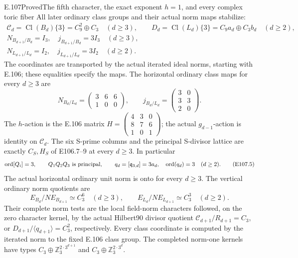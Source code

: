 \begin{statement}{E.107}{Proved}{The fifth character, the exact exponent \(h=1\), and every complex toric fiber}
All later ordinary class groups and their actual norm maps stabilize:
\[
 \begin{gathered}
 \mathcal C_d=\operatorname{Cl}(B_d)\{3\}=C_9^2\oplus C_3
       \quad(d\ge3),\qquad
 D_d=\operatorname{Cl}(L_d)\{3\}=C_9a_d\oplus C_3b_d
       \quad(d\ge2),\\
 N_{B_{d+1}/B_d}=I_3,\quad j_{B_{d+1}/B_d}=3I_3
       \quad(d\ge3),\\
 N_{L_{d+1}/L_d}=I_2,\quad j_{L_{d+1}/L_d}=3I_2
       \quad(d\ge2).
 \end{gathered}
 \tag{E107.3}
\]
The coordinates are transported by the actual iterated ideal norms,
starting with E.106; these equalities specify the maps. The horizontal
ordinary class maps for every \(d\ge3\) are
\[
 N_{B_d/L_d}=
 \begin{pmatrix}3&6&6\\1&0&0\end{pmatrix},\qquad
 j_{B_d/L_d}=
 \begin{pmatrix}3&0\\3&3\\2&0\end{pmatrix}.
 \tag{E107.4}
\]
The \(h\)-action is the E.106 matrix
\(H=\left(\begin{smallmatrix}4&3&0\\8&7&6\\1&0&1\end{smallmatrix}\right)\);
the actual \(g_{d-1}\)-action is identity on \(\mathcal C_d\).
The six S-prime columns and the principal S-divisor lattice are
exactly \(C_S,H_S\) of E106.7--9 at every \(d\ge3\).
In particular
\[
 \operatorname{ord}[Q_i]=3,\qquad
 Q_1Q_2Q_3\ \hbox{is principal},\qquad
 q_d=[\mathfrak q_{3,d}]=3a_d,\quad
 \operatorname{ord}(q_d)=3\quad(d\ge2).
 \tag{E107.5}
\]
The actual horizontal ordinary unit norm is onto for every \(d\ge3\).
The vertical ordinary norm quotients are
\[
 E_{B_d}/N E_{B_{d+1}}\simeq C_3^6\quad(d\ge3),\qquad
 E_{L_d}/N E_{L_{d+1}}\simeq C_3^3\quad(d\ge2).
 \tag{E107.6}
\]
Their complete norm tests are the local field-norm characters followed,
on the zero character kernel, by the actual Hilbert90 divisor quotient
\(\mathcal C_{d+1}/R_{d+1}=C_3\), or
\(D_{d+1}/\langle q_{d+1}\rangle=C_3^2\), respectively.
Every class coordinate is computed by the iterated norm to the fixed
E.106 class group. The completed norm-one kernels have types
\(C_3\oplus\mathbb Z_3^{2\cdot3^{d+1}}\) and
\(C_3\oplus\mathbb Z_3^{2\cdot3^d}\).


\end{statement}
